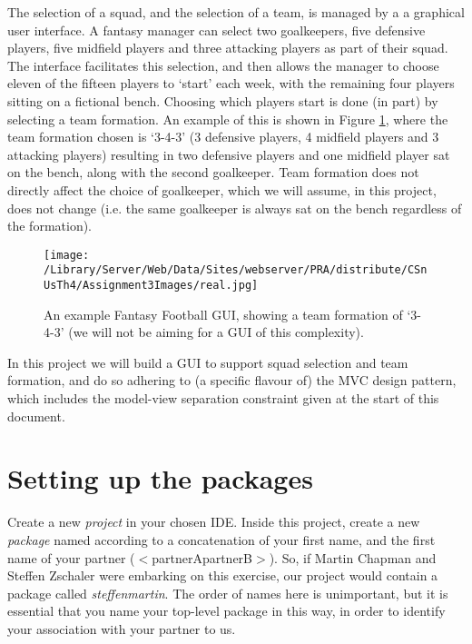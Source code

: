 \documentclass[11pt]{article}
\begin{document}
The selection of a squad, and the selection of a team, is managed by a a graphical user interface. A fantasy manager can select two goalkeepers, five defensive players, five midfield players and three attacking players as part of their squad. The interface facilitates this selection, and then allows the manager to choose eleven of the fifteen players to `start' each week, with the remaining four players sitting on a fictional bench. Choosing which players start is done (in part) by selecting a team formation. An example of this is shown in Figure \ref{fig:real}, where the team formation chosen is `3-4-3' (3 defensive players, 4 midfield players and 3 attacking players) resulting in two defensive players and one midfield player sat on the bench, along with the second goalkeeper. Team formation does not directly affect the choice of goalkeeper, which we will assume, in this project, does not change (i.e. the same goalkeeper is always sat on the bench regardless of the formation).

\begin{figure}[htbp]
\begin{center}
\texttt{[image: /Library/Server/Web/Data/Sites/webserver/PRA/distribute/CSnUsTh4/Assignment3Images/real.jpg]}
\caption{An example Fantasy Football GUI, showing a team formation of `3-4-3' (we will not be aiming for a GUI of this complexity).}
\label{fig:real}
\end{center}
\end{figure}

In this project we will build a GUI to support squad selection and team formation, and do so adhering to (a specific flavour of) the MVC design pattern, which includes the model-view separation constraint given at the start of this document. 

\section{Setting up the packages}

Create a new \emph{project} in your chosen IDE. Inside this project, create a new \emph{package} named according to a concatenation of your first name, and the first name of your partner ($<$partnerApartnerB$>$). So, if Martin Chapman and Steffen Zschaler were embarking on this exercise, our project would contain a package called \emph{steffenmartin}. The order of names here is unimportant, but it is essential that you name your top-level package in this way, in order to identify your association with your partner to us.
\end{document}

